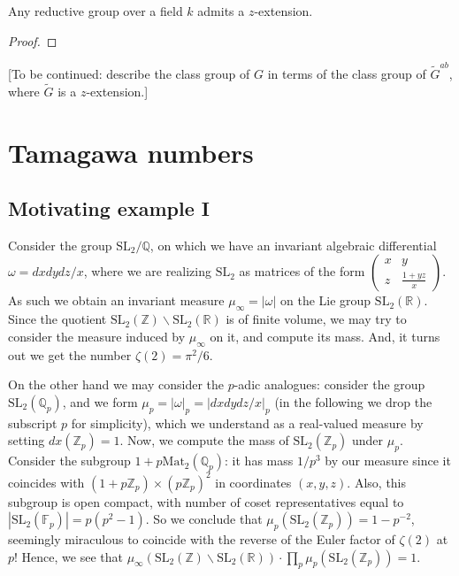 \begin{proposition}
 \label{proposition-z-extension-exists}
Any reductive group over a field $k$ admits a $z$-extension.
\end{proposition}


\begin{proof}
\end{proof}

[To be continued: describe the class group of $G$ in terms of the class group of $\tilde G^{ab}$, where $\tilde G$ is a $z$-extension.]

\section{Tamagawa numbers}
\label{section-Tamagawa-numbers}
	
	
\subsection{Motivating example I}
\label{subsection-example1}
	Consider the group $\mathrm{SL}_2/\mathbb{Q}$, on which we have an invariant algebraic differential $\omega = dx dy dz/x$, where we are realizing $\mathrm{SL}_2$ as matrices of the form 
	$\begin{pmatrix}
	x&y\\z&\frac{1+yz}{x}
	\end{pmatrix}$. As such we obtain an invariant measure $\mu_\infty = |\omega|$ 
	on the Lie group 
	$\mathrm{SL}_2(\mathbb{R})$. Since the quotient 
	$\mathrm{SL}_2(\mathbb{Z})\backslash \mathrm{SL}_2(\mathbb{R})$ is of finite volume, we may try to consider the measure induced by $\mu_\infty$ on it, and compute its mass. And, it turns out we get the number $\zeta(2)=\pi^2/6$.
	
	
	On the other hand we may consider the $p$-adic analogues: consider the group $\mathrm{SL}_2(\mathbb{Q}_p)$, and we form $\mu_p = |\omega|_p=|dxdydz/x|_p$ (in the following we drop the subscript $p$ for simplicity), which we understand as a real-valued measure by setting $dx(\mathbb Z_p)=1$. Now, we compute the mass of $\mathrm{SL}_2(\mathbb{Z}_p)$ under $\mu_p$. Consider the subgroup $1+p\mathrm{Mat}_2(\mathbb{Q}_p)$: it has mass $1/p^3$ by our measure since it coincides with $(1+p\mathbb{Z}_p)\times (p\mathbb{Z}_p)^2$ in coordinates $(x,y,z)$. Also, this subgroup is open compact, with number of coset representatives equal to $|\mathrm{SL}_2(\mathbb{F}_p)|=p(p^2-1)$. So we conclude that $\mu_p(\mathrm{SL}_2(\mathbb{Z}_p)) = 1-p^{-2}$, seemingly miraculous to coincide with the reverse of the Euler factor of $\zeta(2)$ at $p$! Hence, we see that 
	$\mu_\infty(\mathrm{SL}_2(\mathbb Z)\backslash \mathrm{SL}_2(\mathbb R))\cdot \prod_p \mu_p(\mathrm{SL}_2(\mathbb{Z}_p)) = 1$.
	
